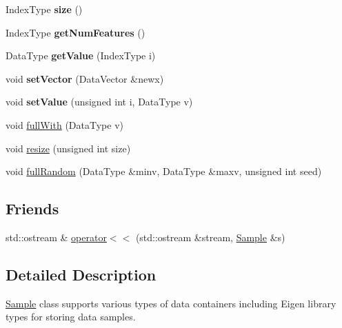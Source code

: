 \begin{DoxyCompactItemize}
\item 
\hypertarget{classffactory_1_1_sample_a74e563854f48b923833d3854775a66de}{Index\-Type {\bfseries size} ()}\label{classffactory_1_1_sample_a74e563854f48b923833d3854775a66de}

\item 
\hypertarget{classffactory_1_1_sample_a67b290e1cedd354733592241c80ba6f1}{Index\-Type {\bfseries get\-Num\-Features} ()}\label{classffactory_1_1_sample_a67b290e1cedd354733592241c80ba6f1}

\item 
\hypertarget{classffactory_1_1_sample_a3369e6c9c9307e526ff9529c888527b7}{Data\-Type {\bfseries get\-Value} (Index\-Type i)}\label{classffactory_1_1_sample_a3369e6c9c9307e526ff9529c888527b7}

\item 
\hypertarget{classffactory_1_1_sample_a2c78715df2fc14ca7e0e966dc581fdd8}{void {\bfseries set\-Vector} (Data\-Vector \&newx)}\label{classffactory_1_1_sample_a2c78715df2fc14ca7e0e966dc581fdd8}

\item 
\hypertarget{classffactory_1_1_sample_a8336459065003781c9ba56f7b704a8df}{void {\bfseries set\-Value} (unsigned int i, Data\-Type v)}\label{classffactory_1_1_sample_a8336459065003781c9ba56f7b704a8df}

\item 
void \hyperlink{classffactory_1_1_sample_aa70ede381c2b10d0addc5ba339d9c705}{full\-With} (Data\-Type v)
\item 
void \hyperlink{classffactory_1_1_sample_acf58702023003d4369178f84cd8cf83e}{resize} (unsigned int size)
\item 
void \hyperlink{classffactory_1_1_sample_abdd511f0b8a780760cd286c0ac040535}{full\-Random} (Data\-Type \&minv, Data\-Type \&maxv, unsigned int seed)
\end{DoxyCompactItemize}
\subsection*{Friends}
\begin{DoxyCompactItemize}
\item 
std\-::ostream \& \hyperlink{classffactory_1_1_sample_a4eb73fff7adcf55cf5bc433a43efcf84}{operator$<$$<$} (std\-::ostream \&stream, \hyperlink{classffactory_1_1_sample}{Sample} \&s)
\end{DoxyCompactItemize}


\subsection{Detailed Description}
\hyperlink{classffactory_1_1_sample}{Sample} class supports various types of data containers including Eigen library types for storing data samples. 

